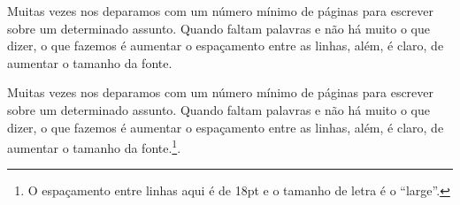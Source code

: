 
\newpage

\thispagestyle{empty}

\noindent
Muitas vezes nos deparamos com um número mínimo de páginas para escrever sobre um determinado assunto. Quando faltam palavras e não há muito o que dizer, o que fazemos é aumentar o espaçamento entre as linhas, além, é claro, de aumentar o tamanho da fonte.
\\

\baselineskip=18pt

{\large
\noindent
Muitas vezes nos deparamos com um número mínimo de páginas para escrever sobre um determinado assunto. Quando faltam palavras e não há muito o que dizer, o que fazemos é aumentar o espaçamento entre as linhas, além, é claro, de aumentar o tamanho da fonte.\footnote{O espaçamento entre linhas aqui é de 18pt e o tamanho de letra é o ``large''.}.}
